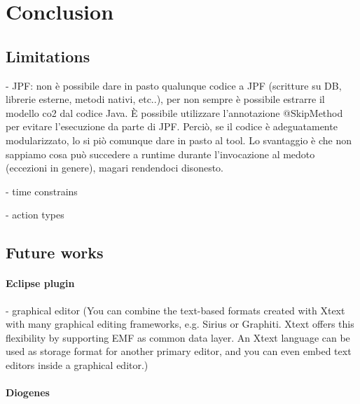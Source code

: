 \section{Conclusion}

\subsection{Limitations}
- JPF: non è possibile dare in pasto qualunque codice a JPF (scritture su DB, librerie esterne, metodi nativi, etc..), per non sempre è possibile estrarre il modello co2 dal codice Java. È possibile utilizzare l'annotazione @SkipMethod per evitare l'esecuzione da parte di JPF. Perciò, se il codice è adeguatamente modularizzato, lo si piò comunque dare in pasto al tool. Lo svantaggio è che non sappiamo cosa può succedere a runtime durante l'invocazione al medoto (eccezioni in genere), magari rendendoci disonesto.

- time constrains

- action types

\subsection{Future works}

\paragraph{Eclipse plugin}
- graphical editor (You can combine the text-based formats created with Xtext with many graphical editing frameworks, e.g. Sirius or Graphiti. Xtext offers this flexibility by supporting EMF as common data layer. An Xtext language can be used as storage format for another primary editor, and you can even embed text editors inside a graphical editor.)

\paragraph{Diogenes}
